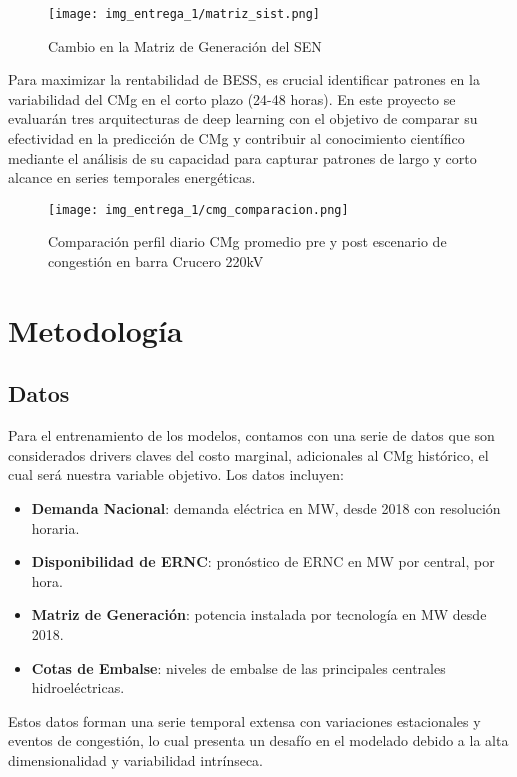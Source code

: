 \documentclass[11pt, twocolumn]{article}
\begin{document}
\begin{figure}[!b]
    \centering
    \texttt{[image: img\_entrega\_1/matriz\_sist.png]}
    \caption{Cambio en la Matriz de Generación del SEN}
    \label{fig:matriz_sistema}
\end{figure}

Para maximizar la rentabilidad de BESS, es crucial identificar patrones en la variabilidad del CMg en el corto plazo (24-48 horas). En este proyecto se evaluarán tres arquitecturas de deep learning con el objetivo de comparar su efectividad en la predicción de CMg y contribuir al conocimiento científico mediante el análisis de su capacidad para capturar patrones de largo y corto alcance en series temporales energéticas.

\begin{figure}[!b]
    \centering
    \texttt{[image: img\_entrega\_1/cmg\_comparacion.png]}
    \caption{Comparación perfil diario CMg promedio pre y post escenario de congestión en barra Crucero 220kV}
    \label{fig:cmg_comparacion}
\end{figure}

\section{Metodología}
\subsection{Datos}
Para el entrenamiento de los modelos, contamos con una serie de datos que son considerados drivers claves del costo marginal, adicionales al CMg histórico, el cual será nuestra variable objetivo. Los datos incluyen:

\begin{itemize}
    \item \textbf{Demanda Nacional}: demanda eléctrica en MW, desde 2018 con resolución horaria.
    \item \textbf{Disponibilidad de ERNC}: pronóstico de ERNC en MW por central, por hora.
    \item \textbf{Matriz de Generación}: potencia instalada por tecnología en MW desde 2018.
    \item \textbf{Cotas de Embalse}: niveles de embalse de las principales centrales hidroeléctricas.
\end{itemize}

Estos datos forman una serie temporal extensa con variaciones estacionales y eventos de congestión, lo cual presenta un desafío en el modelado debido a la alta dimensionalidad y variabilidad intrínseca.
\end{document}
